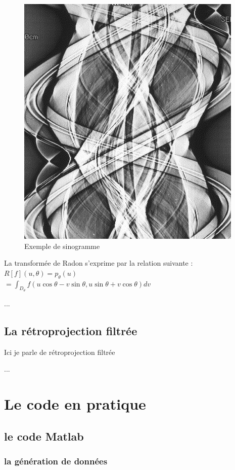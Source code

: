 \documentclass[conference]{IEEEtran}
\begin{document}
\begin{figure}[H]
\centering
\includegraphics[scale=0.4]{sinogrammeExemple}
\caption[Exemple de sinogramme]{Exemple de sinogramme}
\label{fig:gallery}
\end{figure}

La transformée de Radon s'exprime par la relation suivante :
$R[f](u,\theta)=p_\theta(u)$
\\%
$=\int_{D_\theta} f(u\cos\theta-v\sin\theta, u\sin\theta+v\cos\theta)dv$

...

\subsection{La rétroprojection filtrée}

Ici je parle de rétroprojection filtrée

...


\section{Le code en pratique}


\subsection{le code Matlab}

\subsubsection{la génération de données}
\end{document}
